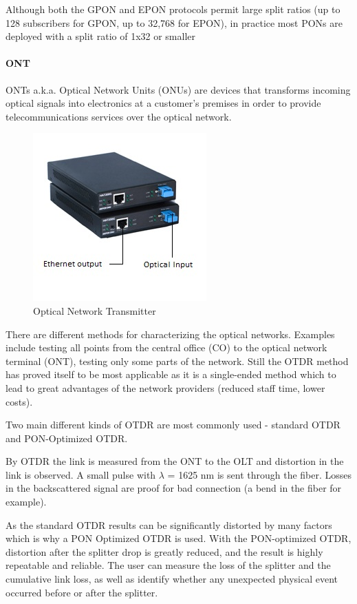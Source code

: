 Although both the GPON and EPON protocols permit large split ratios (up to 128 subscribers for GPON, up to 32,768 for EPON), in practice most PONs are deployed with a split ratio of 1x32 or smaller


\paragraph{ONT}

ONTs a.k.a. Optical Network Units (ONUs) are devices that transforms incoming optical signals into electronics at a customer's premises in order to provide telecommunications services over the optical network.
\begin{figure}%
\centering
\includegraphics[width=.4\columnwidth]{grafiken/onu.jpg}%
\caption{Optical Network Transmitter}%
\label{}%
\end{figure}

There are different methods for characterizing the optical networks. Examples include testing all points from the central office (CO) to the optical network terminal (ONT), testing only some parts of the network. Still the OTDR method has proved itself to be most applicable as it is a single-ended method which to lead to great advantages of the network providers (reduced staff time, lower costs).

Two main different kinds of OTDR are most commonly used - standard OTDR and PON-Optimized OTDR.

By OTDR the link is measured from the ONT to the OLT and distortion in the link is observed. A small pulse with $\lambda$ = 1625 nm is sent through the fiber. Losses in the backscattered signal are proof for bad connection (a bend in the fiber for example).

As the standard OTDR results can be significantly distorted by many factors which is why a PON Optimized OTDR is used. With the PON-optimized OTDR, distortion after the splitter drop is greatly reduced, and the result is highly repeatable and reliable. The user can measure the loss of the splitter and the cumulative link loss, as well as identify whether any unexpected physical event occurred before or after the splitter.


